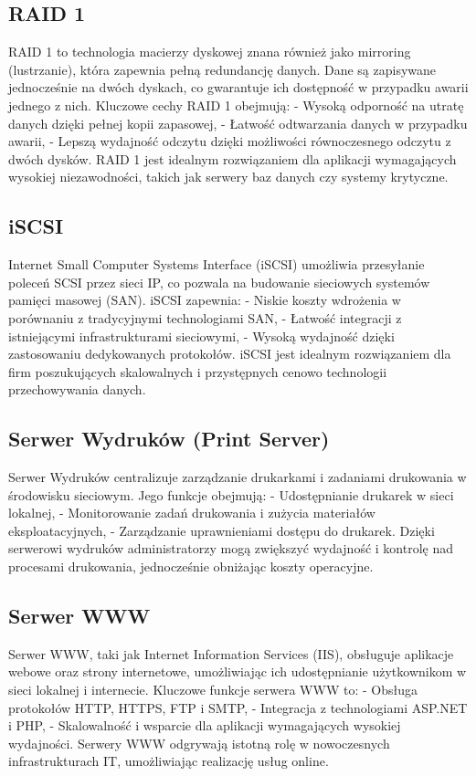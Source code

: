 \subsection{RAID 1}
RAID 1 to technologia macierzy dyskowej znana również jako mirroring (lustrzanie), która zapewnia pełną redundancję danych. Dane są zapisywane jednocześnie na dwóch dyskach, co gwarantuje ich dostępność w przypadku awarii jednego z nich. Kluczowe cechy RAID 1 obejmują:
- Wysoką odporność na utratę danych dzięki pełnej kopii zapasowej,
- Łatwość odtwarzania danych w przypadku awarii,
- Lepszą wydajność odczytu dzięki możliwości równoczesnego odczytu z dwóch dysków.
RAID 1 jest idealnym rozwiązaniem dla aplikacji wymagających wysokiej niezawodności, takich jak serwery baz danych czy systemy krytyczne.

\subsection{iSCSI}
Internet Small Computer Systems Interface (iSCSI) umożliwia przesyłanie poleceń SCSI przez sieci IP, co pozwala na budowanie sieciowych systemów pamięci masowej (SAN). iSCSI zapewnia:
- Niskie koszty wdrożenia w porównaniu z tradycyjnymi technologiami SAN,
- Łatwość integracji z istniejącymi infrastrukturami sieciowymi,
- Wysoką wydajność dzięki zastosowaniu dedykowanych protokołów.
iSCSI jest idealnym rozwiązaniem dla firm poszukujących skalowalnych i przystępnych cenowo technologii przechowywania danych.

\subsection{Serwer Wydruków (Print Server)}
Serwer Wydruków centralizuje zarządzanie drukarkami i zadaniami drukowania w środowisku sieciowym. Jego funkcje obejmują:
- Udostępnianie drukarek w sieci lokalnej,
- Monitorowanie zadań drukowania i zużycia materiałów eksploatacyjnych,
- Zarządzanie uprawnieniami dostępu do drukarek.
Dzięki serwerowi wydruków administratorzy mogą zwiększyć wydajność i kontrolę nad procesami drukowania, jednocześnie obniżając koszty operacyjne.

\subsection{Serwer WWW}
Serwer WWW, taki jak Internet Information Services (IIS), obsługuje aplikacje webowe oraz strony internetowe, umożliwiając ich udostępnianie użytkownikom w sieci lokalnej i internecie. Kluczowe funkcje serwera WWW to:
- Obsługa protokołów HTTP, HTTPS, FTP i SMTP,
- Integracja z technologiami ASP.NET i PHP,
- Skalowalność i wsparcie dla aplikacji wymagających wysokiej wydajności.
Serwery WWW odgrywają istotną rolę w nowoczesnych infrastrukturach IT, umożliwiając realizację usług online.

